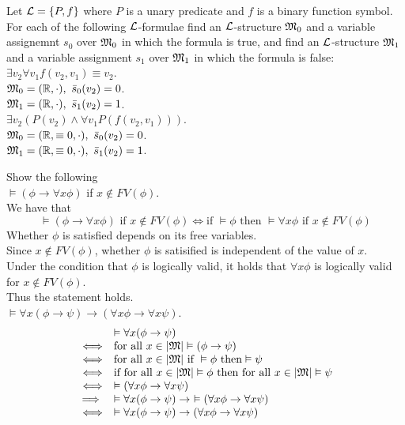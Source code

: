 \documentclass[11pt,a4paper]{article}
\begin{document}
\question
Let $\mathcal{L}=\{P,f\}$ where $P$ is a unary predicate and $f$ is a binary function symbol.\\
For each of the following $\mathcal{L}$-formulae find an $\mathcal{L}$-structure $\mathfrak{M}_0$ and a variable assignemnt $s_0$ over $\mathfrak{M}_0$ in which the formula is true, and find an $\mathcal{L}$-structure $\mathfrak{M}_1$ and a variable assignment $s_1$ over $\mathfrak{M}_1$ in which the formula is false:\\

\qpartnb $\exists v_2\forall v_1 f(v_2,v_1)\equiv v_2$.\\

\apart
$\M_0=(\reals,\cdot),\ \bar{s}_0(v_2)=0$.\\
$\M_1=(\reals,\cdot),\ \bar{s}_1(v_2)=1$.\\

\qpartnb $\exists v_2(P(v_2)\wedge\forall v_1 P(f(v_2,v_1)))$.\\

\apart
$\M_0=(\reals,\equiv0,\cdot),\ \bar{s}_0(v_2)=0$.\\
$\M_1=(\reals,\equiv0,\cdot),\ \bar{s}_1(v_2)=1$.

\setcounter{section}{4}
\question
Show the following\\

\qpartnb $\vDash (\phi\to\forall x\phi)$ if $x\not\in FV(\phi)$.\\

\apart
We have that
$$\vDash(\phi\to\forall x\phi)\text{ if }x\not\in FV(\phi)\Longleftrightarrow\text{if }\vDash\phi\text{ then }\vDash\forall x\phi\text{ if }x\not\in FV(\phi)$$
Whether $\phi$ is satisfied depends on its free variables.\\
Since $x\not\in FV(\phi)$, whether $\phi$ is satisified is independent of the value of $x$.\\
Under the condition that $\phi$ is logically valid, it holds that $\forall x\phi$ is logically valid for $x\not\in FV(\phi)$.\\
Thus the statement holds.\\

\qpartnb $\vDash \forall x(\phi\to\psi)\to(\forall x\phi\to\forall x\psi)$.\\

\apart
\[\begin{array}{rl}
&\vDash \forall x(\phi\to\psi)\\
\Longleftrightarrow&\text{for all }x\in|\mathfrak{M}|\vDash(\phi\to\psi)\\
\Longleftrightarrow&\text{for all }x\in|\mathfrak{M}|\text{ if }\vDash\phi\text{ then}\vDash\psi\\
\Longleftrightarrow&\text{if }\text{for all }x\in|\mathfrak{M}|\vDash\phi\text{ then for all }x\in|\mathfrak{M}|\vDash\psi\\
\Longleftrightarrow&\vDash(\forall x\phi\to\forall x\psi)\\
\implies&\vDash \forall x(\phi\to\psi)\to\ \vDash(\forall x\phi\to\forall x\psi)\\
\Longleftrightarrow&\vDash \forall x(\phi\to\psi)\to(\forall x\phi\to\forall x\psi)
\end{array}\]
\end{document}
